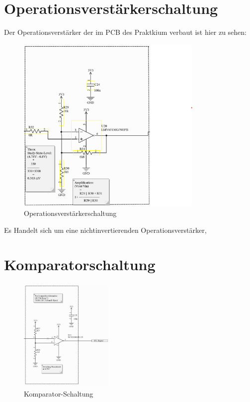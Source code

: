\section{Operationsverstärkerschaltung} %
Der Operationsverstärker der im PCB des Praktkium verbaut ist hier zu sehen:
\begin{figure}[H]
    \centering
    \includegraphics[width=0.8\textwidth]{Pictures/OP_Verstaerker.png}
    \caption{Operationsverstärkerschaltung}
    \label{fig:opamp_schaltung}
\end{figure}
Es Handelt sich um eine nichtinvertierenden Operationsverstärker,

\section{Komparatorschaltung} %

\begin{figure}[H]
    \centering
    \includegraphics[width=0.4\textwidth]{Pictures/Komparator.png}
    \caption{Komparator-Schaltung}
    \label{fig:opamp_schaltung}
\end{figure}

